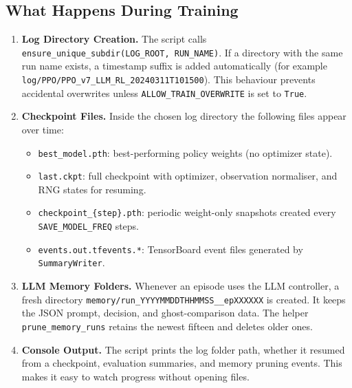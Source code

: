 \documentclass[12pt]{article}
\begin{document}
\subsection{What Happens During Training}
\begin{enumerate}[leftmargin=1.2cm]
  \item \textbf{Log Directory Creation.} The script calls \texttt{ensure\_unique\_subdir(LOG\_ROOT, RUN\_NAME)}. If a directory with the same run name exists, a timestamp suffix is added automatically (for example \texttt{log/PPO/PPO\_v7\_LLM\_RL\_20240311T101500}). This behaviour prevents accidental overwrites unless \texttt{ALLOW\_TRAIN\_OVERWRITE} is set to \texttt{True}.
  \item \textbf{Checkpoint Files.} Inside the chosen log directory the following files appear over time:
    \begin{itemize}
      \item \texttt{best\_model.pth}: best-performing policy weights (no optimizer state).
      \item \texttt{last.ckpt}: full checkpoint with optimizer, observation normaliser, and RNG states for resuming.
      \item \texttt{checkpoint\_\{step\}.pth}: periodic weight-only snapshots created every \texttt{SAVE\_MODEL\_FREQ} steps.
      \item \texttt{events.out.tfevents.*}: TensorBoard event files generated by \texttt{SummaryWriter}.
    \end{itemize}
  \item \textbf{LLM Memory Folders.} Whenever an episode uses the LLM controller, a fresh directory \texttt{memory/run\_YYYYMMDDTHHMMSS\_\_epXXXXXX} is created. It keeps the JSON prompt, decision, and ghost-comparison data. The helper \texttt{prune\_memory\_runs} retains the newest fifteen and deletes older ones.
  \item \textbf{Console Output.} The script prints the log folder path, whether it resumed from a checkpoint, evaluation summaries, and memory pruning events. This makes it easy to watch progress without opening files.
\end{enumerate}
\end{document}
